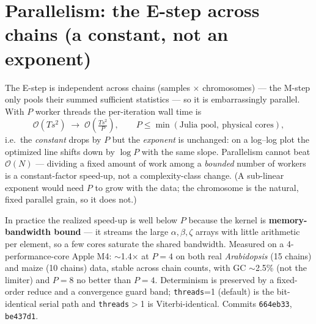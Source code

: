 \documentclass[11pt]{article}
\newcommand{\bigO}{\mathcal{O}}
\newcommand{\code}[1]{\texttt{#1}}
\begin{document}
\section{Parallelism: the E-step across chains (a constant, not an exponent)}

The E-step is independent across chains (samples $\times$ chromosomes) — the
M-step only pools their summed sufficient statistics — so it is embarrassingly
parallel. With $P$ worker threads the per-iteration wall time is
\[
\bigO(T s^2)\;\longrightarrow\;\bigO\!\left(\tfrac{T s^2}{P}\right),
\qquad P \le \min(\text{Julia pool},\ \text{physical cores}),
\]
i.e.\ the \emph{constant} drops by $P$ but the \emph{exponent} is unchanged: on a
log--log plot the optimized line shifts down by $\log P$ with the same slope.
Parallelism cannot beat $\bigO(N)$ — dividing a fixed amount of work among a
\emph{bounded} number of workers is a constant-factor speed-up, not a
complexity-class change. (A sub-linear exponent would need $P$ to grow with the
data; the chromosome is the natural, fixed parallel grain, so it does not.)

In practice the realized speed-up is well below $P$ because the kernel is
\textbf{memory-bandwidth bound} — it streams the large $\alpha,\beta,\zeta$ arrays
with little arithmetic per element, so a few cores saturate the shared bandwidth.
Measured on a 4-performance-core Apple M4: $\sim$1.4$\times$ at $P=4$ on both real
\emph{Arabidopsis} (15 chains) and maize (10 chains) data, stable across chain
counts, with GC $\sim$2.5\% (not the limiter) and $P=8$ no better than $P=4$.
Determinism is preserved by a fixed-order reduce and a convergence guard band;
\code{threads}=1 (default) is the bit-identical serial path and \code{threads}$>$1
is Viterbi-identical. Commits \code{664eb33}, \code{be437d1}.
\end{document}
